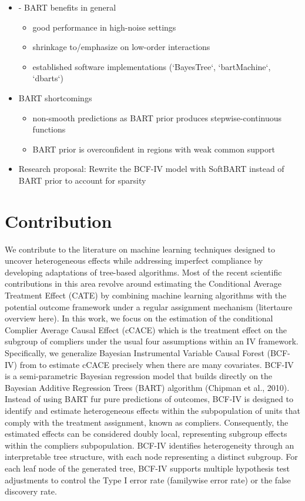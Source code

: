 \begin{itemize}
    \item - BART benefits in general %
    \begin{itemize}
        \item good performance in high-noise settings 
        \item shrinkage to/emphasize on low-order interactions
        \item established software implementations (`BayesTree`, `bartMachine`, `dbarts`)
    \end{itemize}  
    \item BART shortcomings %
    \begin{itemize}
        \item non-smooth predictions as BART prior produces stepwise-continuous functions
        \item BART prior is overconfident in regions with weak common support
    \end{itemize}
    \item Research proposal: Rewrite the BCF-IV model with SoftBART instead of BART prior to account for sparsity
\end{itemize}



\section{Contribution}

We contribute to the literature on machine learning techniques designed to uncover heterogeneous effects while addressing imperfect compliance by developing adaptations of tree-based algorithms.
Most of the recent scientific contributions in this area revolve around estimating the Conditional Average Treatment Effect (CATE) by combining machine learning algorithms with the potential outcome framework under a regular assignment mechanism (litertaure overview here).
In this work, we focus on the estimation of the conditional Complier Average Causal Effect (cCACE) which is the treatment effect on the subgroup of compliers under the usual four assumptions within an IV framework. 
Specifically, we generalize Bayesian Instrumental Variable Causal Forest (BCF-IV) from \citep{bargagli-stoffi_heterogeneous_2022} to estimate cCACE precisely when there are many covariates. 
BCF-IV is a semi-parametric Bayesian regression model that builds directly on the Bayesian Additive Regression Trees (BART) algorithm (Chipman et al., 2010).
Instead of using BART fur pure predictions of outcomes, BCF-IV is designed to identify and estimate heterogeneous effects within the subpopulation of units that comply with the treatment assignment, known as compliers. 
Consequently, the estimated effects can be considered doubly local, representing subgroup effects within the compliers subpopulation.
BCF-IV identifies heterogeneity through an interpretable tree structure, with each node representing a distinct subgroup.
For each leaf node of the generated tree, BCF-IV supports multiple hypothesis test adjustments to control the Type I error rate (familywise error rate) or the false discovery rate. 

